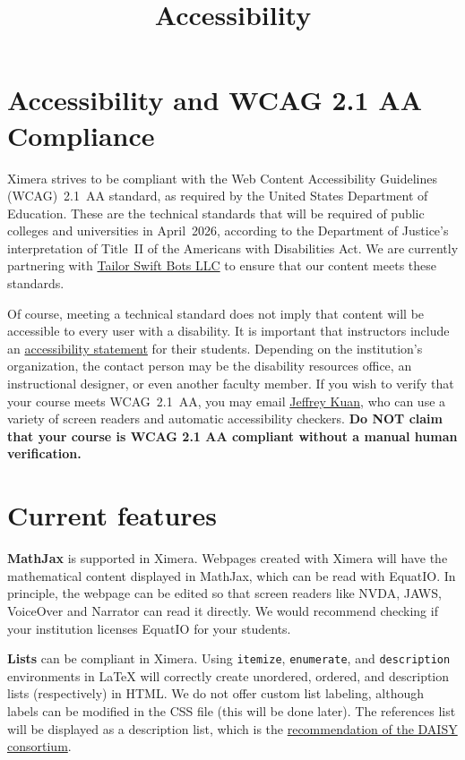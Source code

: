 \documentclass{ximera}
\title{Accessibility}
\begin{document}
\begin{abstract}
\end{abstract}
\maketitle


\section*{Accessibility and WCAG 2.1 AA Compliance}

Ximera strives to be compliant with the Web Content Accessibility Guidelines (WCAG)~2.1~AA standard, as required by the United States Department of Education. These are the technical standards that will be required of public colleges and universities in April~2026, according to the Department of Justice’s interpretation of Title~II of the Americans with Disabilities Act. We are currently partnering with \href{https://tailorswiftbot.com/}{Tailor Swift Bots LLC} to ensure that our content meets these standards.

Of course, meeting a technical standard does not imply that content will be accessible to every user with a disability. It is important that instructors include an \href{https://www.w3.org/WAI/planning/statements/}{accessibility statement} for their students. Depending on the institution’s organization, the contact person may be the disability resources office, an instructional designer, or even another faculty member. If you wish to verify that your course meets WCAG~2.1~AA, you may email \href{mailto:kuan.44@osu.edu}{Jeffrey Kuan}, who can use a variety of screen readers and automatic accessibility checkers. \textbf{Do NOT claim that your course is WCAG 2.1 AA compliant without a manual human verification.}

\section*{Current features}

\textbf{MathJax} is supported in Ximera.  
Webpages created with Ximera will have the mathematical content displayed in MathJax, which can be read with EquatIO. In principle, the webpage can be edited so that screen readers like NVDA, JAWS, VoiceOver and Narrator can read it directly. We would recommend checking if your institution licenses EquatIO for your students.

\medskip
\textbf{Lists} can be compliant in Ximera.  
Using \verb|itemize|, \verb|enumerate|, and \verb|description| environments in \LaTeX{} will correctly create unordered, ordered, and description lists (respectively) in HTML. We do not offer custom list labeling, although labels can be modified in the CSS file (this will be done later). The references list will be displayed as a description list, which is the \href{http://kb.daisy.org/publishing/docs/html/bibliographies.html}{recommendation of the DAISY consortium}.
\end{document}
